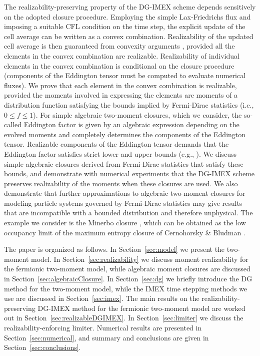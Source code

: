 The realizability-preserving property of the DG-IMEX scheme depends sensitively on the adopted closure procedure.  
Employing the simple Lax-Friedrichs flux and imposing a suitable CFL condition on the time step, the explicit update of the cell average can be written as a convex combination.  
Realizability of the updated cell average is then guaranteed from convexity arguments \cite{zhangShu_2010a}, provided all the elements in the convex combination are realizable.  
Realizability of individual elements in the convex combination is conditional on the closure procedure (components of the Eddington tensor must be computed to evaluate numerical fluxes).  
We prove that each element in the convex combination is realizable, provided the moments involved in expressing the elements are moments of a distribution function satisfying the bounds implied by Fermi-Dirac statistics (i.e., $0\le f \le 1$).  
For simple algebraic two-moment closures, which we consider, the so-called Eddington factor is given by an algebraic expression depending on the evolved moments and completely determines the components of the Eddington tensor.  
Realizable components of the Eddington tensor demands that the Eddington factor satisfies strict lower and upper bounds (e.g., \cite{levermore_1984,lareckiBanach_2011}).  
We discuss simple algebraic closures derived from Fermi-Dirac statistics that satisfy these bounds, and demonstrate with numerical experiments that the DG-IMEX scheme preserves realizability of the moments when these closures are used.  
We also demonstrate that further approximations to algebraic two-moment closures for modeling particle systems governed by Fermi-Dirac statistics may give results that are incompatible with a bounded distribution and therefore unphysical.  
The example we consider is the Minerbo closure \cite{minerbo_1978}, which can be obtained as the low occupancy limit of the maximum entropy closure of Cernohorsky \& Bludman \cite{cernohorskyBludman_1994}.  

The paper is organized as follows.  
In Section~\ref{sec:model} we present the two-moment model.  
In Section~\ref{sec:realizability} we discuss moment realizability for the fermionic two-moment model, while algebraic moment closures are discussed in Section~\ref{sec:algebraicClosure}.  
In Section~\ref{sec:dg} we briefly introduce the DG method for the two-moment model, while the IMEX time stepping methods we use are discussed in Section~\ref{sec:imex}.  
The main results on the realizability-preserving DG-IMEX method for the fermionic two-moment model are worked out in Section~\ref{sec:realizableDGIMEX}.  
In Section~\ref{sec:limiter} we discuss the realizability-enforcing limiter.  
Numerical results are presented in Section~\ref{sec:numerical}, and summary and conclusions are given in Section~\ref{sec:conclusions}.  
